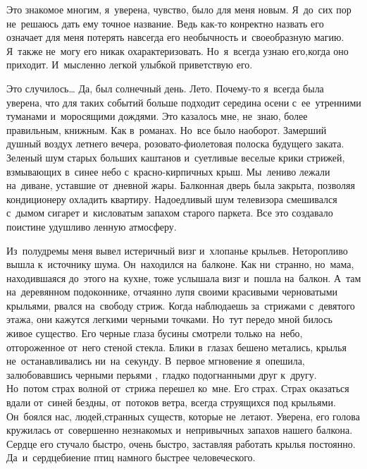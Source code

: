 \chap{***
} 
Это знакомое многим, я~уверена, чувство, было для меня новым.
Я~до~сих пор не~решаюсь дать ему точное название.
Ведь как-то конректно назвать его означает для меня потерять навсегда его необычность и~своеобразную магию.
Я~также не~могу его никак охарактеризовать.
Но~я~всегда узнаю его,когда оно приходит.
И~мысленно легкой улыбкой приветствую его.
 
Это случилось… Да, был солнечный день.
Лето.
Почему-то я~всегда была уверена, что для таких событий больше подходит середина осени с~ее~утренними туманами и~моросящими дождями.
Это казалось мне, не~знаю, более правильным, книжным.
Как в~романах.
Но~все было наоборот.
Замерший душный воздух летнего вечера, розовато-фиолетовая полоска будущего заката.
Зеленый шум старых больших каштанов и~суетливые веселые крики стрижей, взмывающих в~синее небо с~красно-кирпичных крыш.
Мы~лениво лежали на~диване, уставшие от~дневной жары.
Балконная дверь была закрыта, позволяя кондиционеру охладить квартиру.
Надоедливый шум телевизора смешивался с~дымом сигарет и~кисловатым запахом старого паркета.
Все это создавало поистине удушливо ленную атмосферу.
 
Из~полудремы меня вывел истеричный визг и~хлопанье крыльев.
Неторопливо вышла к~источнику шума.
Он~находился на~балконе.
Как ни~странно, но~мама, находившаяся до~этого на~кухне, тоже услышала визг и~пошла на~балкон.
А~там на~деревянном подоконнике, отчаянно лупя своими красивыми черноватыми крыльями, рвался на~свободу стриж.
Когда наблюдаешь за~стрижами с~девятого этажа, они кажутся легкими черными точками.
Но~тут передо мной билось живое существо.
Его черные глаза бусины смотрели только на~небо, отгороженное от~него стеной стекла.
Блики в~глазах бешено метались, крылья не~останавливались ни~на~секунду.
В~первое мгновение я~опешила, залюбовавшись черными перьями ,~гладко подогнанными друг к~другу.
Но~потом страх волной от~стрижа перешел ко~мне.
Его страх.
Страх оказаться вдали от~синей бездны, от~потоков ветра, всегда струящихся под крыльями.
Он~боялся нас, людей,странных существ, которые не~летают.
Уверена, его голова кружилась от~совершенно незнакомых и~непривычных запахов нашего балкона.
Сердце его стучало быстро, очень быстро, заставляя работать крылья постоянно.
Да~и~сердцебиение птиц намного быстрее человеческого.
 
